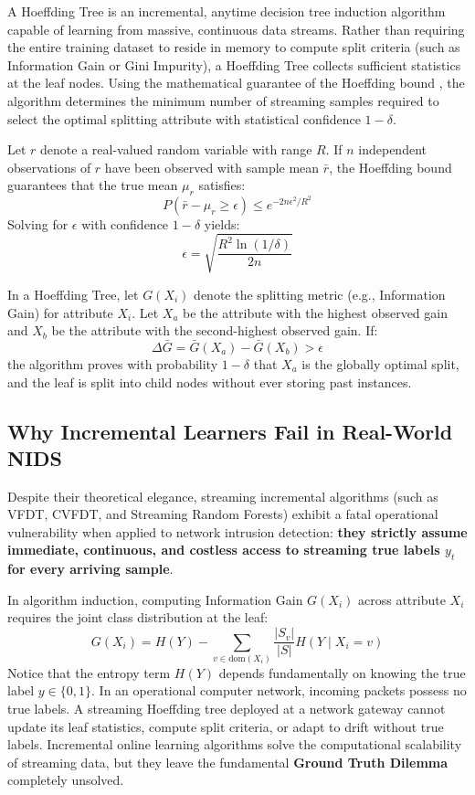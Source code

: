 \documentclass[12pt,a4paper,oneside]{report}
\begin{document}
A Hoeffding Tree is an incremental, anytime decision tree induction algorithm capable of learning from massive, continuous data streams. Rather than requiring the entire training dataset to reside in memory to compute split criteria (such as Information Gain or Gini Impurity), a Hoeffding Tree collects sufficient statistics at the leaf nodes. Using the mathematical guarantee of the Hoeffding bound \cite{hoeffding1963}, the algorithm determines the minimum number of streaming samples required to select the optimal splitting attribute with statistical confidence $1 - \delta$.

Let $r$ denote a real-valued random variable with range $R$. If $n$ independent observations of $r$ have been observed with sample mean $\bar{r}$, the Hoeffding bound guarantees that the true mean $\mu_r$ satisfies:
\begin{equation}
P\left( \bar{r} - \mu_r \ge \epsilon \right) \le e^{-2 n \epsilon^2 / R^2}
\end{equation}
Solving for $\epsilon$ with confidence $1 - \delta$ yields:
\begin{equation}
\epsilon = \sqrt{\frac{R^2 \ln(1/\delta)}{2n}}
\end{equation}

In a Hoeffding Tree, let $G(X_i)$ denote the splitting metric (e.g., Information Gain) for attribute $X_i$. Let $X_a$ be the attribute with the highest observed gain and $X_b$ be the attribute with the second-highest observed gain. If:
\begin{equation}
\Delta \bar{G} = \bar{G}(X_a) - \bar{G}(X_b) > \epsilon
\end{equation}
the algorithm proves with probability $1 - \delta$ that $X_a$ is the globally optimal split, and the leaf is split into child nodes without ever storing past instances.

\subsection{Why Incremental Learners Fail in Real-World NIDS}
Despite their theoretical elegance, streaming incremental algorithms (such as VFDT, CVFDT, and Streaming Random Forests) exhibit a fatal operational vulnerability when applied to network intrusion detection: \textbf{they strictly assume immediate, continuous, and costless access to streaming true labels $y_t$ for every arriving sample}.

In algorithm induction, computing Information Gain $G(X_i)$ across attribute $X_i$ requires the joint class distribution at the leaf:
\begin{equation}
G(X_i) = H(Y) - \sum_{v \in \text{dom}(X_i)} \frac{|S_v|}{|S|} H(Y \mid X_i = v)
\end{equation}
Notice that the entropy term $H(Y)$ depends fundamentally on knowing the true label $y \in \{0, 1\}$. In an operational computer network, incoming packets possess no true labels. A streaming Hoeffding tree deployed at a network gateway cannot update its leaf statistics, compute split criteria, or adapt to drift without true labels. Incremental online learning algorithms solve the computational scalability of streaming data, but they leave the fundamental \textbf{Ground Truth Dilemma} completely unsolved.
\end{document}
